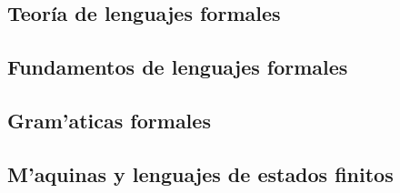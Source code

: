 \documentclass[letterpaper,12pt,dvips]{book}
\newcommand{\fnz}{\footnotesize}
\newcounter{ejemplo}
\begin{document}
\begin{mainmatter}

 \pagestyle{fancyplain}
 \lhead[\fancyplain{}{}]
       {\fancyplain{}{\fnz{\rightmark}}}
 \rhead[\fancyplain{}{\fnz{\leftmark}}]
       {\fancyplain{}{}}


\part{Teoría de lenguajes formales}
\chapter{Fundamentos de lenguajes formales}\label{cap:fundamentos}


\setcounter{ejemplo}{0}
\chapter{Gram'aticas formales}\label{cap:gramaticas}



\setcounter{ejemplo}{0}
\chapter{M'aquinas y lenguajes de estados finitos}


 
 
 


\end{mainmatter}
\end{document}
